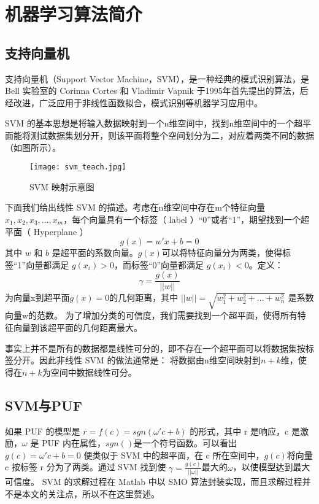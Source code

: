 \section{机器学习算法简介}

\subsection{支持向量机}
支持向量机（Support Vector Machine，SVM），是一种经典的模式识别算法，是 Bell 实验室的 Corinna Cortes 和 Vladimir Vapnik 于1995年首先提出的算法，后经改进，广泛应用于非线性函数拟合，模式识别等机器学习应用中\supercite{cortes1995support}。

SVM 的基本思想是将输入数据映射到一个n维空间中，找到n维空间中的一个超平面能将测试数据集划分开，则该平面将整个空间划分为二，对应着两类不同的数据（如图所示）。

\begin{figure}[h]
\centering
\texttt{[image: svm\_teach.jpg]}
\caption{ SVM 映射示意图}
\label{fig:svm_proj}
\end{figure}

下面我们给出线性 SVM 的描述。考虑在n维空间中存在m个特征向量 $ x_1,x_2,x_3,…,x_m $，每个向量具有一个标签（ label ）``0''或者``1''，期望找到一个超平面（ Hyperplane ）
\begin{equation}
g(x)=w'x+b=0
\end{equation}
其中 $ w $ 和 $ b $ 是超平面的系数向量。$ g(x) $可以将特征向量分为两类，使得标签``1''向量都满足 $ g(x_i )>0 $，而标签``0''向量都满足 $ g(x_i )<0 $。定义：
\begin{equation}
\gamma=\frac{g(x)}{||w||}
\end{equation}
为向量x到超平面$ g(x)=0 $的几何距离，其中
$ ||w||=\sqrt{w_1^2+w_2^2+...+w_n^2} $
是系数向量w的范数。
为了增加分类的可信度，我们需要找到一个超平面，使得所有特征向量到该超平面的几何距离最大。

事实上并不是所有的数据都是线性可分的，即不存在一个超平面可以将数据集按标签分开。因此非线性 SVM 的做法通常是：
将数据由n维空间映射到$ n+k $维，使得在$ n+k $为空间中数据线性可分。

\subsection{SVM与PUF}
如果 PUF 的模型是 $ r=f(c)=sgn(\omega'c+b) $ 的形式，其中 r 是响应，c 是激励，$ \omega $ 是 PUF 内在属性，$ sgn() $是一个符号函数。可以看出 $ g(c)=\omega'c+b=0 $ 便类似于 SVM 中的超平面，在 c 所在空间中，$ g(c) $将向量 c 按标签 r 分为了两类。通过 SVM 找到使 $ \gamma=\frac{g(c)}{||\omega||} $最大的$ \omega $，以使模型达到最大可信度。 SVM 的求解过程在 Matlab 中以 SMO 算法封装实现，而且求解过程并不是本文的关注点，所以不在这里赘述。


